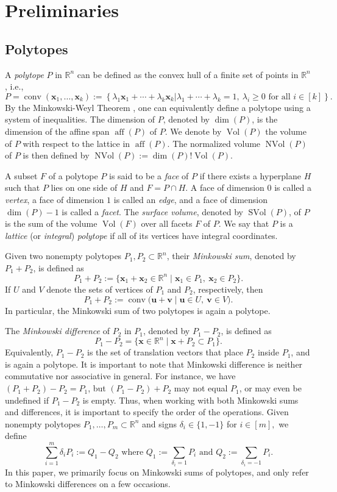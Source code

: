 \documentclass[11pt,a4paper]{article}
\newcommand{\vct}[1]{\boldsymbol{#1}}
\newcommand{\R}{\mathbb{R}}
\newcommand{\conv}{\operatorname{conv}}
\newcommand{\aff}{\operatorname{aff}}
\newcommand{\Vol}{\operatorname{Vol}}
\newcommand{\NVol}{\operatorname{NVol}}
\newcommand{\SVol}{\operatorname{SVol}}
\newcommand{\1}{\mathbf{1}}
\theoremstyle{plain}
\theoremstyle{definition}
\begin{document}
\section{Preliminaries}\label{sec:prelim}
\subsection{Polytopes}

A \emph{polytope} $P$ in $\R^n$ can be defined as the convex hull of a finite set of points in $\R^n$, i.e.,
\[
P=\conv(\vct{x}_1,\ldots,\vct{x}_k)
 :=\left\{\lambda_1\vct{x}_1+\cdots+\lambda_k\vct{x}_k
 \mathrel{\Big|}
 \lambda_1+\cdots+\lambda_k=1,\ \lambda_i\ge 0\text{ for all }i\in[k]\right\}.
\]
By the Minkowski-Weyl Theorem \cite{Minkowski1968, Weyl1934}, one can equivalently define a polytope using a system of inequalities. The dimension of $P$, denoted by $\dim(P)$, is the dimension of the affine span $\aff(P)$ of $P$. We denote by $\Vol(P)$ the volume of $P$ with respect to the lattice in $\aff(P)$. The normalized volume $\NVol(P)$ of $P$ is then defined by $\NVol(P) := \dim(P)!\Vol(P).$

A subset $F$ of a polytope $P$ is said to be a \emph{face} of $P$ if there exists a hyperplane $H$ such that $P$ lies on one side of $H$ and $F=P\cap H$. A face of dimension $0$ is called a \emph{vertex}, a face of dimension $1$ is called an \emph{edge}, and a face of dimension $\dim(P)-1$ is called a \emph{facet}. The \emph{surface volume}, denoted by $\SVol(P)$, of $P$ is the sum of the volume $\Vol(F)$ over all facets $F$ of $P$. We say that $P$ is a \emph{lattice} (or \emph{integral}) \emph{polytope} if all of its vertices have integral coordinates.


Given two nonempty polytopes $P_1,P_2\subset\mathbb{R}^n$, their \emph{Minkowski sum}, denoted by $P_1+P_2$, is defined as
\[
P_1+P_2
:=
\{\vct{x}_1+\vct{x}_2\in\mathbb{R}^n\mid \vct{x}_1\in P_1,\ \vct{x}_2\in P_2\}.
\]
If $U$ and $V$ denote the sets of vertices of $P_1$ and $P_2$, respectively, then
\[
P_1+P_2
:=
\conv\bigl(\vct{u}+\vct{v}\mid \vct{u}\in U,\ \vct{v}\in V\bigr).
\]
In particular, the Minkowski sum of two polytopes is again a polytope.

The \emph{Minkowski difference} of $P_2$ in $P_1$, denoted by $P_1-P_2$, is defined as
\[
P_1-P_2
=
\{\vct{x}\in\mathbb{R}^n\mid \vct{x}+P_2\subset P_1\}.
\]
Equivalently, $P_1-P_2$ is the set of translation vectors that place $P_2$ inside $P_1$, and is again a polytope. It is important to note that Minkowski difference is neither commutative nor associative in general. For instance, we have $(P_1 + P_2) - P_2 = P_1$, but $(P_1 - P_2) + P_2$ may not equal $P_1$, or may even be undefined if $P_1 - P_2$ is empty. Thus, when working with both Minkowski sums and differences, it is important to specify the order of the operations. Given nonempty polytopes $P_1,\ldots,P_m\subset\mathbb{R}^n$ and signs $\delta_i\in\{1,-1\}$ for $i\in[m],$ we define
\[\sum^{m}_{i = 1}\delta_i P_i := Q_1 - Q_2 \text{ where } Q_1 := \sum_{\delta_i = 1} P_i \text{ and } Q_2 := \sum_{\delta_i = -1} P_i.\]
In this paper, we primarily focus on Minkowski sums of polytopes, and only refer to Minkowski differences on a few occasions.
\end{document}
